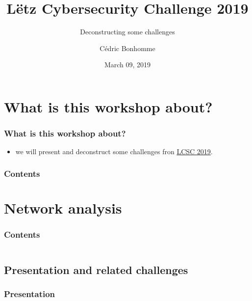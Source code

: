 \documentclass[]{beamer}
\title[Deconstructing some challenges from LCSC 2019]{Lëtz Cybersecurity Challenge 2019}
\subtitle{Deconstructing some challenges}
\author{C\'{e}dric Bonhomme}
\institute[SMILE]{Security Made In Lëtzebuerg}
\date{March 09, 2019}
\begin{document}
\begin{frame}
    \titlepage
\end{frame}


%
%
\section*{What is this workshop about?}
\begin{frame}
    \frametitle{What is this workshop about?}
    \begin{center}
        \begin{itemize}
            \item we will present and deconstruct some challenges fron \href{https://github.com/cscluxembourg/vestatech}{LCSC 2019}.
        \end{itemize}
    \end{center}
\end{frame}


\begin{frame}
    \frametitle{Contents}
    \tableofcontents
\end{frame}



%
%
\section{Network analysis}
\begin{frame}
    \frametitle{Contents}
    \begin{columns}[t]
        \begin{column}{5cm}
            \tableofcontents[sections={1-2}, currentsection, hideothersubsections]
        \end{column}
        \begin{column}{5cm}
            \tableofcontents[sections={3-4}, currentsection, hideothersubsections]
        \end{column}
    \end{columns}
\end{frame}
\subsection{Presentation and related challenges}
\begin{frame}
\frametitle{Presentation}
\framesubtitle{}

\end{frame}
\end{document}
